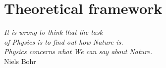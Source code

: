 \chapter{Theoretical framework}
\label{chp:the}

\begin{flushright}
\begin{small}
\emph{
It is wrong to think that the task\\ of Physics is to find out how Nature is.\\
Physics concerns what We can say about Nature.\\}
Niels Bohr
\end{small}
\end{flushright}

\minitoc




